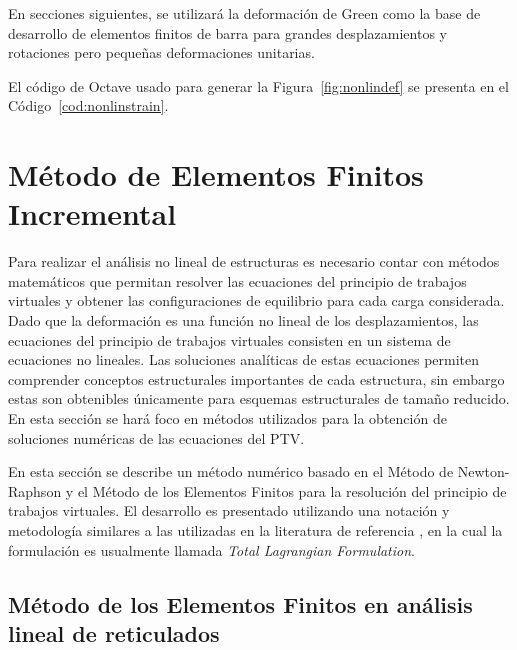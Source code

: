 En secciones siguientes, se utilizará la deformación de Green como la base de desarrollo de elementos finitos de barra para grandes desplazamientos y rotaciones pero pequeñas deformaciones unitarias.

El código de Octave usado para generar la Figura~\ref{fig:nonlindef} se presenta en el Código~\ref{cod:nonlinstrain}.






\section{Método de Elementos Finitos Incremental}\label{FEM}

Para realizar el análisis no lineal de estructuras es necesario contar con métodos matemáticos que permitan resolver las ecuaciones del principio de trabajos virtuales y obtener las configuraciones de equilibrio para cada carga considerada. %
%
Dado que la deformación es una función no lineal de los desplazamientos, las ecuaciones del principio de trabajos virtuales consisten en un sistema de ecuaciones no lineales. %
%
Las soluciones analíticas de estas ecuaciones permiten comprender conceptos estructurales importantes de cada estructura, sin embargo estas son obtenibles únicamente para esquemas estructurales de tamaño reducido. %
%
En esta sección se hará foco en métodos utilizados para la obtención de soluciones numéricas de las ecuaciones del PTV. %


En esta sección se describe un método numérico basado en el Método de Newton-Raphson y el Método de los Elementos Finitos para la resolución del principio de trabajos virtuales. %
%
El desarrollo es presentado utilizando una notación y metodología similares a las utilizadas en la literatura de referencia \citep{crisfield1996non,DeSouzaNeto2008,DeBorst2012}, en la cual la formulación es usualmente llamada \textit{Total Lagrangian Formulation}. %


\subsection{Método de los Elementos Finitos en análisis lineal de reticulados}

